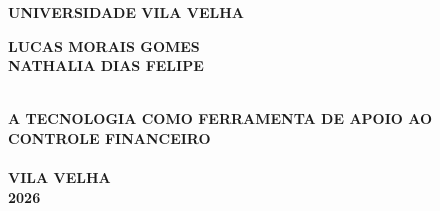 ﻿\thispagestyle{empty}

\vfill
 \begin{center}
    

    {\large\bfseries UNIVERSIDADE VILA VELHA} \\
    

    \vspace*{1in}
    \begin{large} \bfseries LUCAS MORAIS GOMES \\ NATHALIA DIAS FELIPE \end{large}\\[0.4in]

    \vspace*{4cm}
    {\Large \textsc\textbf{{A TECNOLOGIA COMO FERRAMENTA DE APOIO AO CONTROLE FINANCEIRO} }}\\
    \vspace{1cm}
    \noindent \\
    
    \large\bfseries{}
    \vfill
    \large\bfseries{VILA VELHA \\2026}
\end{center}

\normalsize


